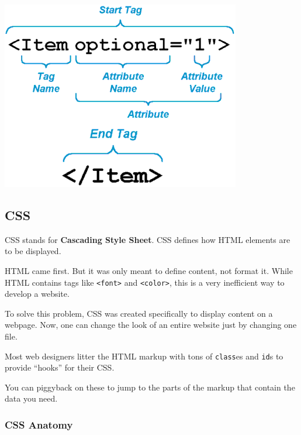 \documentclass[]{book}
\begin{document}
\begin{center}\includegraphics[width=0.7\linewidth]{img/html-attributes} \end{center}

\subsection{CSS}\label{css}

CSS stands for \textbf{Cascading Style Sheet}. CSS defines how HTML
elements are to be displayed.

HTML came first. But it was only meant to define content, not format it.
While HTML contains tags like \texttt{\textless{}font\textgreater{}} and
\texttt{\textless{}color\textgreater{}}, this is a very inefficient way
to develop a website.

To solve this problem, CSS was created specifically to display content
on a webpage. Now, one can change the look of an entire website just by
changing one file.

Most web designers litter the HTML markup with tons of \texttt{class}es
and \texttt{id}s to provide ``hooks'' for their CSS.

You can piggyback on these to jump to the parts of the markup that
contain the data you need.

\subsubsection*{CSS Anatomy}\label{css-anatomy}
\end{document}
